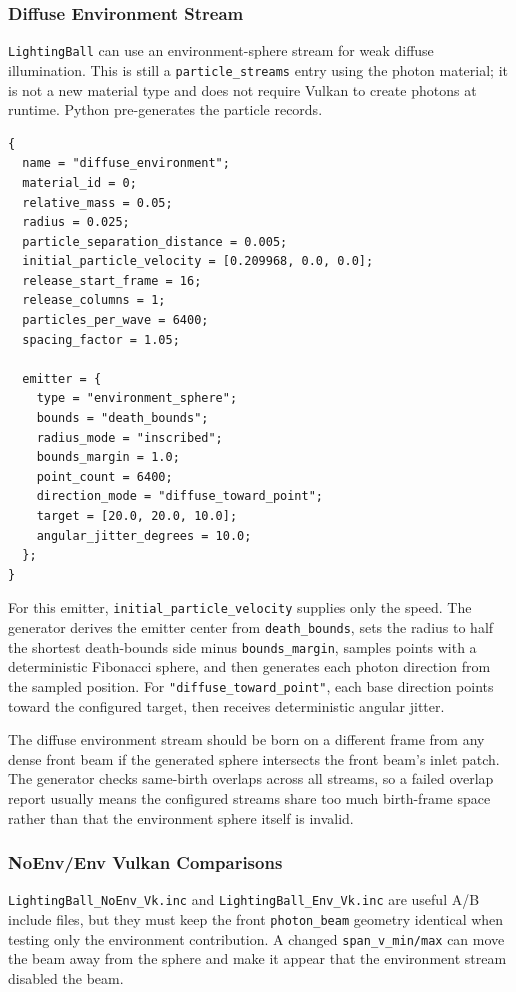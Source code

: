 \subsubsection{Diffuse Environment Stream}

\texttt{LightingBall} can use an environment-sphere stream for weak diffuse
illumination.  This is still a \texttt{particle\_streams} entry using the
photon material; it is not a new material type and does not require Vulkan to
create photons at runtime.  Python pre-generates the particle records.

\begin{verbatim}
{
  name = "diffuse_environment";
  material_id = 0;
  relative_mass = 0.05;
  radius = 0.025;
  particle_separation_distance = 0.005;
  initial_particle_velocity = [0.209968, 0.0, 0.0];
  release_start_frame = 16;
  release_columns = 1;
  particles_per_wave = 6400;
  spacing_factor = 1.05;

  emitter = {
    type = "environment_sphere";
    bounds = "death_bounds";
    radius_mode = "inscribed";
    bounds_margin = 1.0;
    point_count = 6400;
    direction_mode = "diffuse_toward_point";
    target = [20.0, 20.0, 10.0];
    angular_jitter_degrees = 10.0;
  };
}
\end{verbatim}

For this emitter, \texttt{initial\_particle\_velocity} supplies only the
speed.  The generator derives the emitter center from
\texttt{death\_bounds}, sets the radius to half the shortest death-bounds side
minus \texttt{bounds\_margin}, samples points with a deterministic Fibonacci
sphere, and then generates each photon direction from the sampled position.
For \texttt{"diffuse\_toward\_point"}, each base direction points toward the
configured target, then receives deterministic angular jitter.

The diffuse environment stream should be born on a different frame from any
dense front beam if the generated sphere intersects the front beam's inlet
patch.  The generator checks same-birth overlaps across all streams, so a
failed overlap report usually means the configured streams share too much
birth-frame space rather than that the environment sphere itself is invalid.

\subsubsection{NoEnv/Env Vulkan Comparisons}

\texttt{LightingBall\_NoEnv\_Vk.inc} and
\texttt{LightingBall\_Env\_Vk.inc} are useful A/B include files, but they must
keep the front \texttt{photon\_beam} geometry identical when testing only the
environment contribution.  A changed \texttt{span\_v\_min/max} can move the
beam away from the sphere and make it appear that the environment stream
disabled the beam.

